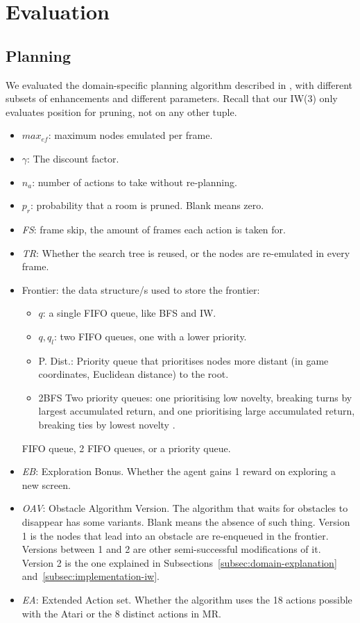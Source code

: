 \chapter{Evaluation}
\section{Planning\label{sec:score-planning}}
We evaluated the domain-specific planning algorithm described in
, with different subsets of enhancements and different
parameters. Recall that our \ac{IW}(3) only evaluates position for pruning, not
on any other tuple.

\begin{itemize}
  \item $max_{ef}$: maximum nodes emulated per frame.
  \item $\gamma$: The discount factor.
  \item $n_a$: number of actions to take without re-planning.
  \item $p_r$: probability that a room is pruned. Blank means zero.
  \item \textit{FS}: frame skip, the amount of frames each action is taken for.
  \item \textit{TR}: Whether the search tree is reused, or the nodes are
    re-emulated in every frame.
  \item Frontier: the data structure/s used to store the frontier:
    \begin{itemize}
      \item $q$: a single \ac{FIFO} queue, like \ac{BFS} and \ac{IW}.
      \item $q,q_l$: two \ac{FIFO} queues, one with a lower priority.
      \item P. Dist.: Priority queue that prioritises nodes more distant (in
        game coordinates, Euclidean distance) to the root.
      \item 2BFS Two priority queues: one prioritising low novelty, breaking
        turns by largest accumulated return, and one prioritising large
accumulated return, breaking ties by lowest novelty \citep{lipovetzky2015classical}.
    \end{itemize}
    \ac{FIFO} queue, 2 \ac{FIFO} queues, or a priority queue.
  \item \textit{EB}: Exploration Bonus. Whether the agent gains 1 reward on
    exploring a new screen.
  \item \textit{OAV}: Obstacle Algorithm Version. The algorithm that waits for
    obstacles to disappear has some variants. Blank means the absence of such
    thing. Version 1 is the nodes that lead into an obstacle are re-enqueued in
    the frontier. Versions between 1 and 2 are other semi-successful
    modifications of it. Version 2 is the one explained in
Subsections~\ref{subsec:domain-explanation} and~\ref{subsec:implementation-iw}.
  \item \textit{EA}: Extended Action set. Whether the algorithm uses the 18
actions possible with the Atari or the 8 distinct actions in \ac{MR}.
\end{itemize}

